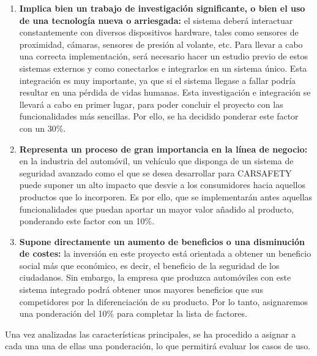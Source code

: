 \begin{enumerate}
\item \textbf{Implica bien un trabajo de investigación significante, o bien el uso de una tecnología nueva o arriesgada:} el sistema deberá interactuar constantemente con diversos dispositivos hardware, tales como sensores de proximidad, cámaras, sensores de presión al volante, etc. Para llevar a cabo una correcta implementación, será necesario hacer un estudio previo de estos sistemas externos y como conectarlos e integrarlos en un sistema único. Esta integración es muy importante, ya que si el sistema llegase a fallar podría resultar en una pérdida de vidas humanas. Esta investigación e integración se llevará a cabo en primer lugar, para poder concluir el proyecto con las funcionalidades más sencillas. Por ello, se ha decidido ponderar este factor con un 30\%.

\item \textbf{Representa un proceso de gran importancia en la línea de negocio:} en la industria del automóvil, un vehículo que disponga de un sistema de seguridad avanzado como el que se desea desarrollar para CARSAFETY puede suponer un alto impacto que desvie a los consumidores hacia aquellos productos que lo incorporen. Es por ello, que se implementarán antes aquellas funcionalidades que puedan aportar un mayor valor añadido al producto, ponderando este factor con un 10\%.

\item \textbf{Supone directamente un aumento de beneficios o una disminución de costes:} la inversión en este proyecto está orientada a obtener un beneficio social más que económico, es decir, el beneficio de la seguridad de los ciudadanos. Sin embargo, la empresa que produzca automóviles con este sistema integrado podrá obtener unos mayores beneficios que sus competidores por la diferenciación de su producto. Por lo tanto, asignaremos una ponderación del 10\% para completar la lista de factores.
\end{enumerate}

\par Una vez analizadas las características principales, se ha procedido a asignar a cada una una de ellas una ponderación, lo que permitirá evaluar los casos de uso.

